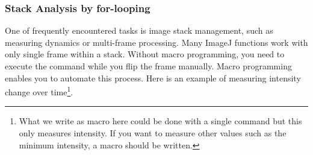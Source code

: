\subsubsection{Stack Analysis by for-looping}
\label{sec:forloopStack}

One of frequently encountered tasks is image stack management, 
such as measuring dynamics or multi-frame processing. 
Many ImageJ functions work with only single frame within a stack. 
Without macro programming, you need to execute the command while you flip the frame manually. 
Macro programming enables you to automate this process. 
Here is an example of measuring intensity change over time\footnote{What we write as macro here could be done with a single command  but this only measures intensity. If you want to measure other values such as the minimum intensity, a macro should be written. }.

\label{code:10}